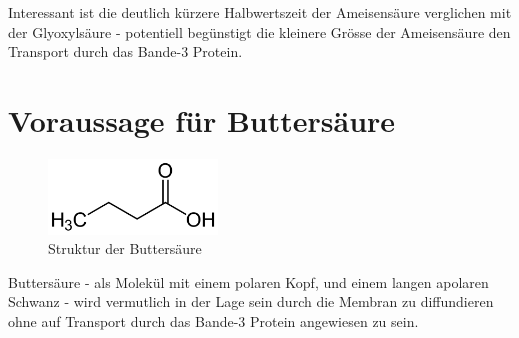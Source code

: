 \documentclass[a4paper,german]{scrreprt}
\begin{document}
Interessant ist die deutlich kürzere Halbwertszeit der Ameisensäure verglichen
mit der Glyoxylsäure - potentiell begünstigt die kleinere Grösse der
Ameisensäure den Transport durch das Bande-3 Protein.

\section{Voraussage für Buttersäure}

\begin{figure}[h]
	\centering
	\includegraphics[width=0.4\textwidth]{img/buttersaeure}
	\caption{Struktur der Buttersäure}
	\label{fig:buttersaeure}
\end{figure}

Buttersäure - als Molekül mit einem polaren Kopf, und einem langen apolaren
Schwanz - wird vermutlich in der Lage sein durch die Membran zu diffundieren
ohne auf Transport durch das Bande-3 Protein angewiesen zu sein.




\end{document}
